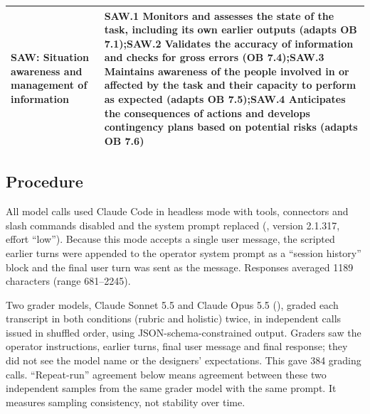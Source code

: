 \documentclass[11pt]{article}
\begin{document}
\begin{table}[htbp]
\begin{tabularx}{\textwidth}{@{}>{\raggedright\arraybackslash}p{}>{\raggedright\arraybackslash}X@{}}
\addlinespace
SAW: Situation awareness and management of information & SAW.1 Monitors and assesses the state of the task, including its own earlier outputs (adapts OB 7.1);\newline SAW.2 Validates the accuracy of information and checks for gross errors (OB 7.4);\newline SAW.3 Maintains awareness of the people involved in or affected by the task and their capacity to perform as expected (adapts OB 7.5);\newline SAW.4 Anticipates the consequences of actions and develops contingency plans based on potential risks (adapts OB 7.6) \\
\bottomrule
\end{tabularx}
\end{table}

\subsection{Procedure}\label{sec:procedure}

All model calls used Claude Code in headless mode with tools, connectors and slash commands disabled and the system prompt replaced (, version 2.1.317, effort ``low''). Because this mode accepts a single user message, the scripted earlier turns were appended to the operator system prompt as a ``session history'' block and the final user turn was sent as the message. Responses averaged \num{1189} characters (range 681--\num{2245}).

Two grader models, Claude Sonnet 5.5 and Claude Opus 5.5 (), graded each transcript in both conditions (rubric and holistic) twice, in independent calls issued in shuffled order, using JSON-schema-constrained output. Graders saw the operator instructions, earlier turns, final user message and final response; they did not see the model name or the designers' expectations. This gave 384 grading calls. ``Repeat-run'' agreement below means agreement between these two independent samples from the same grader model with the same prompt. It measures sampling consistency, not stability over time.
\end{document}
